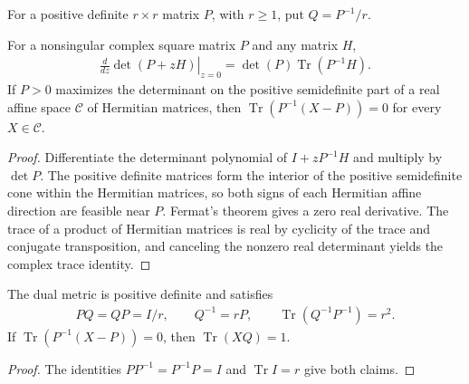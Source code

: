 \begin{definition}
    \label{def:mpu_dual_gram_metric}
    \leanok
    For a positive definite $r\times r$ matrix $P$, with $r\geq1$,
    put $Q=P^{-1}/r$.
\end{definition}

\begin{lemma}
    \label{thm:mpu_determinant_stationarity}
    \leanok
    For a nonsingular complex square matrix $P$ and any matrix $H$,
    \begin{align}
        \left.\frac{d}{dz}\det(P+zH)\right|_{z=0}
        =\det(P)\operatorname{Tr}(P^{-1}H).
    \end{align}
    If $P>0$ maximizes the determinant on the positive semidefinite
    part of a real affine space $\mathcal C$ of Hermitian matrices,
    then $\operatorname{Tr}(P^{-1}(X-P))=0$ for every
    $X\in\mathcal C$.
\end{lemma}
\begin{proof}\leanok
    Differentiate the determinant polynomial of $I+zP^{-1}H$ and
    multiply by $\det P$. The positive definite matrices form the
    interior of the positive semidefinite cone within the Hermitian
    matrices, so both signs of each Hermitian affine direction are
    feasible near $P$. Fermat's theorem gives a zero real derivative.
    The trace of a product of Hermitian matrices is real by cyclicity
    of the trace and conjugate transposition, and canceling the nonzero
    real determinant yields the complex trace identity.
\end{proof}

\begin{lemma}
    \label{thm:mpu_dual_gram_metric_algebra}
    \leanok
    The dual metric is positive definite and satisfies
    \begin{align}
        PQ=QP=I/r,\qquad Q^{-1}=rP,\qquad
        \operatorname{Tr}(Q^{-1}P^{-1})=r^2.
    \end{align}
    If $\operatorname{Tr}(P^{-1}(X-P))=0$, then
    $\operatorname{Tr}(XQ)=1$.
\end{lemma}
\begin{proof}\leanok
    The identities $PP^{-1}=P^{-1}P=I$ and $\operatorname{Tr}I=r$ give both claims.
\end{proof}

